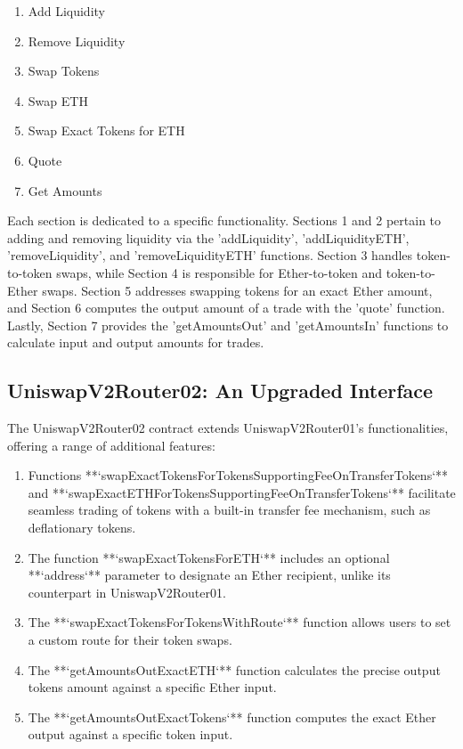 \documentclass[sigconf, authordraft]{acmart}
\begin{document}
	\begin{enumerate}
		\item Add Liquidity

		\item Remove Liquidity

		\item Swap Tokens

		\item Swap ETH

		\item Swap Exact Tokens for ETH

		\item Quote

		\item Get Amounts
	\end{enumerate}

	Each section is dedicated to a specific functionality. Sections 1 and 2 pertain
	to adding and removing liquidity via the 'addLiquidity', 'addLiquidityETH', 'removeLiquidity',
	and 'removeLiquidityETH' functions. Section 3 handles token-to-token swaps,
	while Section 4 is responsible for Ether-to-token and token-to-Ether swaps. Section
	5 addresses swapping tokens for an exact Ether amount, and Section 6 computes
	the output amount of a trade with the 'quote' function. Lastly, Section 7
	provides the 'getAmountsOut' and 'getAmountsIn' functions to calculate input
	and output amounts for trades.

	\subsection{UniswapV2Router02: An Upgraded Interface}


	The UniswapV2Router02 contract extends UniswapV2Router01's functionalities, offering
	a range of additional features:

	\begin{enumerate}
		\item Functions **`swapExactTokensForTokensSupportingFeeOnTransferTokens`** and
			**`swapExactETHForTokensSupportingFeeOnTransferTokens`** facilitate seamless
			trading of tokens with a built-in transfer fee mechanism, such as
			deflationary tokens.

		\item The function **`swapExactTokensForETH`** includes an optional **`address`**
			parameter to designate an Ether recipient, unlike its counterpart in
			UniswapV2Router01.

		\item The **`swapExactTokensForTokensWithRoute`** function allows users to set
			a custom route for their token swaps.

		\item The **`getAmountsOutExactETH`** function calculates the precise output
			tokens amount against a specific Ether input.

		\item The **`getAmountsOutExactTokens`** function computes the exact Ether output
			against a specific token input.
	\end{enumerate}
\end{document}
